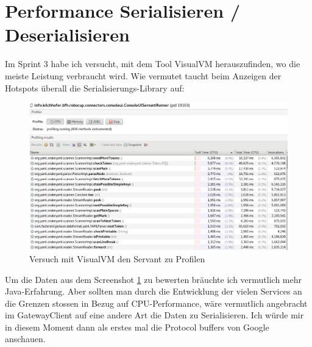 \section{Performance Serialisieren / Deserialisieren}
Im Sprint 3 habe ich versucht, mit dem Tool VisualVM herauszufinden, wo die meiste Leistung verbraucht wird. Wie vermutet taucht beim Anzeigen der Hotspots überall die Serialisierungs-Library  auf:
\begin{figure}[H]
	\centering
	\includegraphics[width=1.0\textwidth]{img/profiling.png}
	\caption{Versuch mit VisualVM den Servant zu Profilen}
	\label{fig:profiling-servant}
\end{figure}
Um die Daten aus dem Screenshot \ref{fig:profiling-servant} zu bewerten bräuchte ich vermutlich mehr Java-Erfahrung. Aber sollten man durch die Entwicklung der vielen Services an die Grenzen stossen in Bezug auf CPU-Performance, wäre vermutlich angebracht im GatewayClient auf eine andere Art die Daten zu Serialisieren. Ich würde mir in diesem Moment dann als erstes mal die Protocol buffers von Google anschauen.